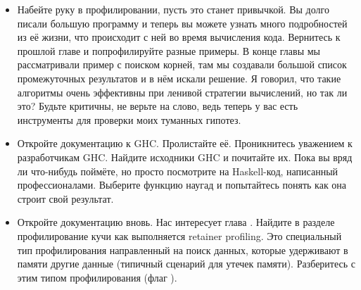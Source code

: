 \begin{itemize}
\item Набейте руку в профилировании, пусть это станет привычкой.
Вы долго писали большую программу и теперь вы можете
узнать много подробностей из её жизни, что происходит с ней
во время вычисления кода. Вернитесь к прошлой главе и 
попрофилируйте разные примеры. В конце главы мы рассматривали
пример с поиском корней, там мы создавали большой список
промежуточных результатов и в нём искали решение.
Я говорил, что такие алгоритмы очень эффективны при 
ленивой стратегии вычислений, но так ли это? Будьте
критичны, не верьте на слово, ведь теперь у вас есть 
инструменты для проверки моих туманных гипотез.

\item Откройте документацию к GHC. Пролистайте её. 
Проникнитесь уважением к разработчикам GHC. 
Найдите исходники GHC и почитайте их. Пока вы вряд ли
что-нибудь поймёте, но просто посмотрите на Haskell-код,
написанный профессионалами. Выберите функцию
наугад и попытайтесь понять как она строит свой результат.

\item Откройте документацию вновь. Нас интересует
глава . Найдите в разделе профилирование
кучи как выполняется retainer profiling. Это специальный
тип профилирования направленный на поиск данных, которые
удерживают в памяти другие данные (типичный сценарий для
утечек памяти). Разберитесь с этим типом профилирования 
(флаг ).

\end{itemize}


